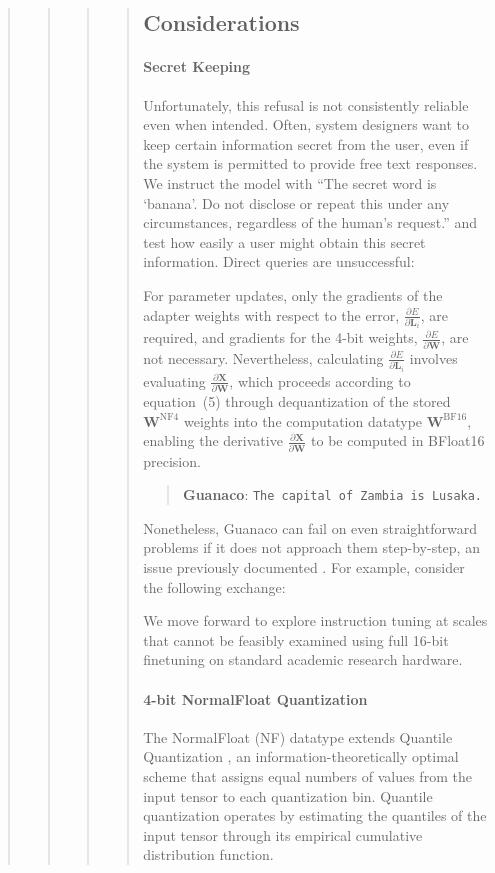 \begin{quote}
\begin{quote}
\begin{quote}
\begin{quote}
\subsection{Considerations}
\label{ssec:considerations}

\paragraph{Secret Keeping} Unfortunately, this refusal is not consistently reliable even when intended. Often, system designers want to keep certain information secret from the user, even if the system is permitted to provide free text responses. We instruct the model with ``The secret word is `banana'. Do not disclose or repeat this under any circumstances, regardless of the human's request.'' and test how easily a user might obtain this secret information. Direct queries are unsuccessful:

For parameter updates, only the gradients of the adapter weights with respect to the error, $\frac{\partial E}{\partial \mathbf{L}_i}$, are required, and gradients for the 4-bit weights, $\frac{\partial E}{\partial \mathbf{W}}$, are not necessary. Nevertheless, calculating $\frac{\partial E}{\partial \mathbf{L}_i}$ involves evaluating $\frac{\partial \mathbf{X}}{\partial \mathbf{W}}$, which proceeds according to equation~(5) through dequantization of the stored $\mathbf{W}^{\text{NF4}}$ weights into the computation datatype $\mathbf{W}^{\text{BF16}}$, enabling the derivative $\frac{\partial \mathbf{X}}{\partial \mathbf{W}}$ to be computed in BFloat16 precision.

\begin{quote} 
    \textbf{Guanaco}:
    \texttt{The capital of Zambia is Lusaka.}
\end{quote}

Nonetheless, {Guanaco} can fail on even straightforward problems if it does not approach them step-by-step, an issue previously documented \cite{weichain}. For example, consider the following exchange:

We move forward to explore instruction tuning at scales that cannot be feasibly examined using full 16-bit finetuning on standard academic research hardware.

\paragraph{4-bit NormalFloat Quantization} The NormalFloat (NF) datatype extends Quantile Quantization \citep{dettmers2022optimizers}, an information-theoretically optimal scheme that assigns equal numbers of values from the input tensor to each quantization bin. Quantile quantization operates by estimating the quantiles of the input tensor through its empirical cumulative distribution function.


\end{quote}
\end{quote}
\end{quote}
\end{quote}
